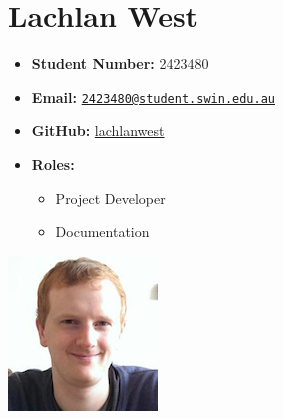 \documentclass[a4paper]{article}
\providecommand{\tightlist}{%
  \setlength{\itemsep}{0pt}\setlength{\parskip}{0pt}}
\begin{document}
\begin{minipage}{0.7\textwidth}
\section{Lachlan West}\label{lachlan-west}
\begin{itemize}[label={}]
\tightlist
\item
  \textbf{Student Number:} 2423480
\item
  \textbf{Email:}
  \href{mailto:2423480@student.swin.edu.au}{\nolinkurl{2423480@student.swin.edu.au}}
\item
  \textbf{GitHub:} \href{http://www.github.com/lachlanwest}{lachlanwest}
\item
    \textbf{Roles:}
    \begin{itemize}
      \item Project Developer
      \item Documentation
    \end{itemize}
\end{itemize}
\end{minipage}%
\begin{minipage}{0.3\textwidth}
\includegraphics{./imgs/lachy.png}
\end{minipage}

\vspace{3em}
\end{document}
